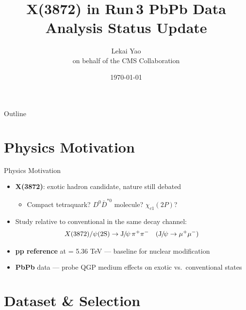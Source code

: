 \documentclass[11pt,aspectratio=169]{beamer}
\title[X(3872) Analysis Status]{X(3872) in Run\,3 PbPb Data \\ Analysis Status Update}
\author[L. Yao et al.]{Lekai Yao \\ \vspace{0.3em}\footnotesize on behalf of the CMS Collaboration}
\institute[CMS]{CMS}
\date{\today}
\begin{document}
\begin{frame}[plain]
  \titlepage
\end{frame}

\begin{frame}{Outline}
  \tableofcontents
\end{frame}

\section{Physics Motivation}

\begin{frame}{Physics Motivation}
  \begin{itemize}
    \item \textbf{X(3872)}: exotic hadron candidate, nature still debated
      \begin{itemize}
        \item Compact tetraquark? $D^0\bar{D}^{*0}$ molecule? $\chi_{c1}(2P)$?
      \end{itemize}
    \item Study relative to conventional \psiP in the same decay channel:
      \begin{equation*}
        X(3872) / \psi\text{(2S)} \to \mathrm{J}\hspace{-.08em}/\hspace{-.14em}\psi \, \pi^{+}\pi^{-} \quad (\mathrm{J}\hspace{-.08em}/\hspace{-.14em}\psi \to \mu^{+}\mu^{-})
      \end{equation*}
    \item \textbf{pp reference} at \sqrtsnn = 5.36 TeV — baseline for nuclear modification
    \item \textbf{PbPb} data — probe QGP medium effects on exotic vs.\ conventional states
  \end{itemize}
\end{frame}

\section{Dataset \& Selection}
\end{document}
